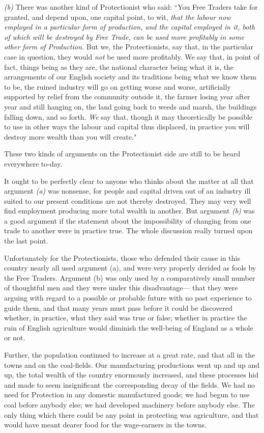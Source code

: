 \documentclass{book}
\begin{document}
\emph{(b)} There was another kind of Protectionist who said: “You Free Traders take for granted, and depend upon, one capital point, to wit, \emph{that the labour now employed in a particular form of production, and the capital employed in it, both of which will be destroyed by Free Trade, can be used more profitably in some other form of Production.} But we, the Protectionists, say that, in the particular case in question, they would \emph{not} be used more profitably. We say that, in point of fact, things being as they are, the national character being what it is, the arrangements of our English society and its traditions being what we know them to be, the ruined industry will go on getting worse and worse, artificially supported by relief from the community outside it, the farmer losing year after year and still hanging on, the land going back to weeds and marsh, the buildings falling down, and so forth. \emph{We} say that, though it may theoretically be possible to use in other ways the labour and capital thus displaced, in practice you will destroy more wealth than you will create."

These two kinds of arguments on the Protectionist side are still to be heard everywhere to-day.

It ought to be perfectly clear to anyone who thinks about the matter at all that argument \emph{(a)} was nonsense, for people and capital driven out of an industry ill suited to our present conditions are not thereby destroyed. They may very well find employment producing more total wealth in another. But argument \emph{(b)} was a good argument if the statement about the impossibility of changing from one trade to another were in practice true. The whole discussion really turned upon the last point.

Unfortunately for the Protectionists, those who defended their cause in this country nearly all used argument (a), and were very properly derided as fools by the Free Traders. Argument (b) was only used by a comparatively small number of thoughtful men and they were under this disadvantage— that they were arguing with regard to a possible or probable future with no past experience to guide them, and that many years must pass before it could be discovered whether, in practice, what they said was true or false; whether in practice the ruin of English agriculture would diminish the well-being of England as a whole or not.

Further, the population continued to increase at a great rate, and that all in the towns and on the coal-fields. Our manufacturing productions went up and up and up, the total wealth of the country enormously increased, and these processes hid and made to seem insignificant the corresponding decay of the fields. We had no need for Protection in any domestic manufactured goods; we had begun to use coal before anybody else; we had developed machinery before anybody else. The only thing which there could be any point in protecting was agriculture, and that would have meant dearer food for the wage-earners in the towns.
\end{document}
